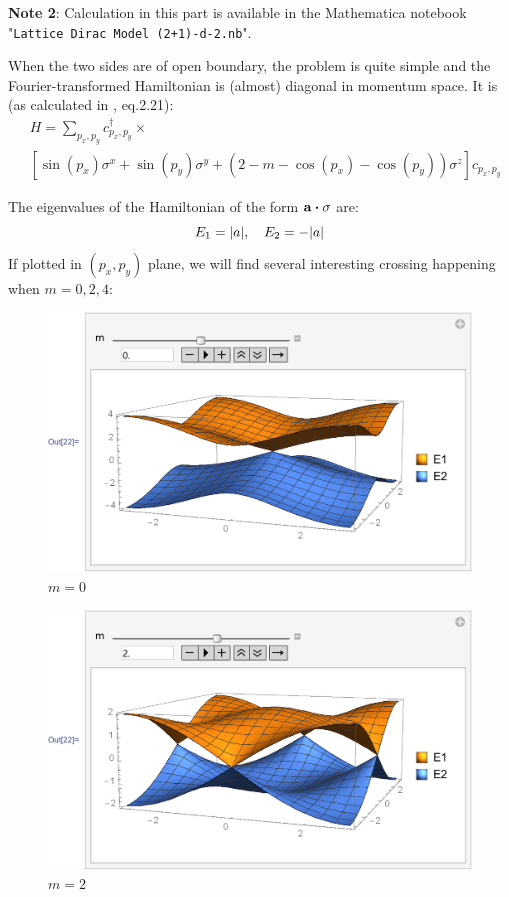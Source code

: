 \documentclass{article}
\begin{document}
    \textbf{Note 2}: Calculation in this part is available in the
    Mathematica notebook "\texttt{Lattice Dirac Model (2+1)-d-2.nb}".

    When the two sides are of open boundary, the problem is quite simple
    and the Fourier-transformed Hamiltonian is (almost) diagonal in
    momentum space. It is (as calculated in \cite{Hughes2009}, eq.2.21):
    \begin{align}
        &H =\sum_{p_x,p_y} c^\dagger_{p_x,p_y}\times
        \nonumber\\
        &
        \left[
            \sin(p_x)\sigma^x + \sin(p_y)\sigma^y
            +(2-m-\cos(p_x)-\cos(p_y))\sigma^z
        \right] c_{p_x,p_y}
    \end{align}

    The eigenvalues of the Hamiltonian of the form
    $\vb{a}\vdot\vb{\sigma}$ are:
    \begin{equation}
        E_1 = \abs{a},\quad E_2 = -\abs{a}
    \end{equation}
    If plotted in $(p_x,p_y)$ plane, we will find several interesting
    crossing happening when $m=0,2,4$:
    \begin{figure}[H]
        \centering
        \includegraphics[width=0.6\linewidth]{pics/OpenBC-inXY/E-m0.pdf}
        \caption{$m=0$}
    \end{figure}
    \begin{figure}[H]
        \centering
        \includegraphics[width=0.6\linewidth]{pics/OpenBC-inXY/E-m2.pdf}
        \caption{$m=2$}
    \end{figure}
\end{document}
